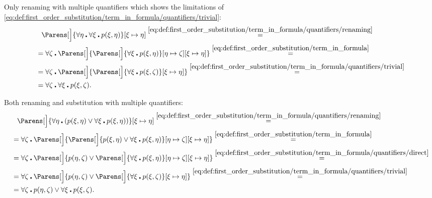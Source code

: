 \begin{example}
\begin{ExEnum}
     Only renaming with multiple quantifiers which shows the limitations of \eqref{eq:def:first_order_substitution/term_in_formula/quantifiers/trivial}:
    \begin{align*}
      &{}\phantom{=}{}
      \Parens[\Big]{\forall \eta \centerdot \forall \xi \centerdot p(\xi, \eta)}[\xi \mapsto \eta]
      \overset {\eqref{eq:def:first_order_substitution/term_in_formula/quantifiers/renaming}} = \\ &=
      \forall \zeta \centerdot \Parens[\Big]{ \Parens[\Big]{ \forall \xi \centerdot p(\xi, \eta) }[\eta \mapsto \zeta][\xi \mapsto \eta]}
      \overset {\eqref{eq:def:first_order_substitution/term_in_formula}} = \\ &=
      \forall \zeta \centerdot \Parens[\Big]{ \Parens[\Big]{ \forall \xi \centerdot p(\xi, \zeta) }[\xi \mapsto \eta]}
      \overset {\eqref{eq:def:first_order_substitution/term_in_formula/quantifiers/trivial}} = \\ &=
      \forall \zeta \centerdot \forall \xi \centerdot p(\xi, \zeta).
    \end{align*}

     Both renaming and substitution with multiple quantifiers:
    \begin{align*}
      &{}\phantom{=}{}
      \Parens[\Big]{ \forall \eta \centerdot (p(\xi, \eta) \vee \forall \xi \centerdot p(\xi, \eta)) }[\xi \mapsto \eta]
      \overset {\eqref{eq:def:first_order_substitution/term_in_formula/quantifiers/renaming}} = \\ &=
      \forall \zeta \centerdot \Parens[\Big]{ \Parens[\Big]{ p(\xi, \eta) \vee \forall \xi \centerdot p(\xi, \eta) }[\eta \mapsto \zeta][\xi \mapsto \eta] }
      \overset {\eqref{eq:def:first_order_substitution/term_in_formula}} = \\ &=
      \forall \zeta \centerdot \Parens[\Big]{ p(\eta, \zeta) \vee \Parens[\Big]{ \forall \xi \centerdot p(\xi, \eta) }[\eta \mapsto \zeta][\xi \mapsto \eta] }
      \overset {\eqref{eq:def:first_order_substitution/term_in_formula/quantifiers/direct}} = \\ &=
      \forall \zeta \centerdot \Parens[\Big]{ p(\eta, \zeta) \vee \Parens[\Big]{ \forall \xi \centerdot p(\xi, \zeta) }[\xi \mapsto \eta] }
      \overset {\eqref{eq:def:first_order_substitution/term_in_formula/quantifiers/trivial}} = \\ &=
      \forall \zeta \centerdot p(\eta, \zeta) \vee \forall \xi \centerdot p(\xi, \zeta).
    \end{align*}


\end{ExEnum}
\end{example}
